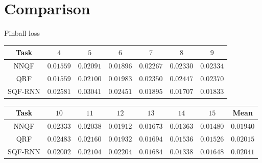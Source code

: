 \documentclass[10pt,aspectratio=169]{beamer}
\begin{document}
\section{Comparison}

\begin{frame}[fragile]{Pinball loss}
    \renewcommand{\b}[1]{\mathbf{#1}}
    \begin{tabular}{c|cccccc}
        Task & \(4\) & \(5\) & \(6\) & \(7\) & \(8\) & \(9\) \\
        \hline
        NNQF    & \(\b{0.01559}\) & \(\b{0.02091}\) & \(\b{0.01896}\) & \(0.02267\)     & \(0.02330\)     & \(0.02334\)     \\
        QRF     & \(0.01559\)     & \(0.02100\)     & \(0.01983\)     & \(0.02350\)     & \(0.02447\)     & \(0.02370\)     \\
        SQF-RNN & \(0.02581\)     & \(0.03041\)     & \(0.02451\)     & \(\b{0.01895}\) & \(\b{0.01707}\) & \(\b{0.01833}\)
    \end{tabular}
    \begin{tabular}{c|cccccc|c}
        Task & \(10\) & \(11\) & \(12\) & \(13\) & \(14\) & \(15\) & Mean \\
        \hline
        NNQF    & \(0.02333\)     & \(\b{0.02038}\) & \(\b{0.01912}\) & \(\b{0.01673}\) & \(\b{0.01363}\) & \(\b{0.01480}\) & \(\b{0.01940}\) \\
        QRF     & \(0.02483\)     & \(0.02160\)     & \(0.01932\)     & \(0.01694\)     & \(0.01536\)     & \(0.01526\)     & \(0.02015\)     \\
        SQF-RNN & \(\b{0.02002}\) & \(0.02104\)     & \(0.02204\)     & \(0.01684\)     & \(0.01338\)     & \(0.01648\)     & \(0.02041\)
    \end{tabular}
\end{frame}
\end{document}
